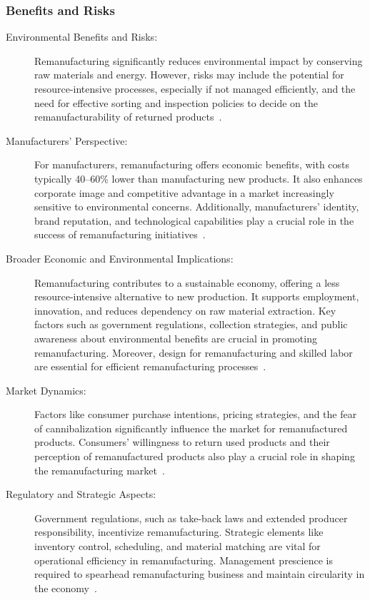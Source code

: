 \subsubsection{Benefits and Risks}
\begin{description}
    \item[Environmental Benefits and Risks:] Remanufacturing significantly reduces environmental impact by conserving raw materials and energy. However, risks may include the potential for resource-intensive processes, especially if not managed efficiently, and the need for effective sorting and inspection policies to decide on the remanufacturability of returned products~\cite{singhal2020reman}.

    \item[Manufacturers' Perspective:] For manufacturers, remanufacturing offers economic benefits, with costs typically 40–60\% lower than manufacturing new products. It also enhances corporate image and competitive advantage in a market increasingly sensitive to environmental concerns. Additionally, manufacturers' identity, brand reputation, and technological capabilities play a crucial role in the success of remanufacturing initiatives~\cite{mitra2005reman, singhal2020reman}.

    \item[Broader Economic and Environmental Implications:] Remanufacturing contributes to a sustainable economy, offering a less resource-intensive alternative to new production. It supports employment, innovation, and reduces dependency on raw material extraction. Key factors such as government regulations, collection strategies, and public awareness about environmental benefits are crucial in promoting remanufacturing. Moreover, design for remanufacturing and skilled labor are essential for efficient remanufacturing processes~\cite{singhal2020reman}.

    \item[Market Dynamics:] Factors like consumer purchase intentions, pricing strategies, and the fear of cannibalization significantly influence the market for remanufactured products. Consumers' willingness to return used products and their perception of remanufactured products also play a crucial role in shaping the remanufacturing market~\cite{singhal2020reman}.

    \item[Regulatory and Strategic Aspects:] Government regulations, such as take-back laws and extended producer responsibility, incentivize remanufacturing. Strategic elements like inventory control, scheduling, and material matching are vital for operational efficiency in remanufacturing. Management prescience is required to spearhead remanufacturing business and maintain circularity in the economy~\cite{singhal2020reman}.
\end{description}

